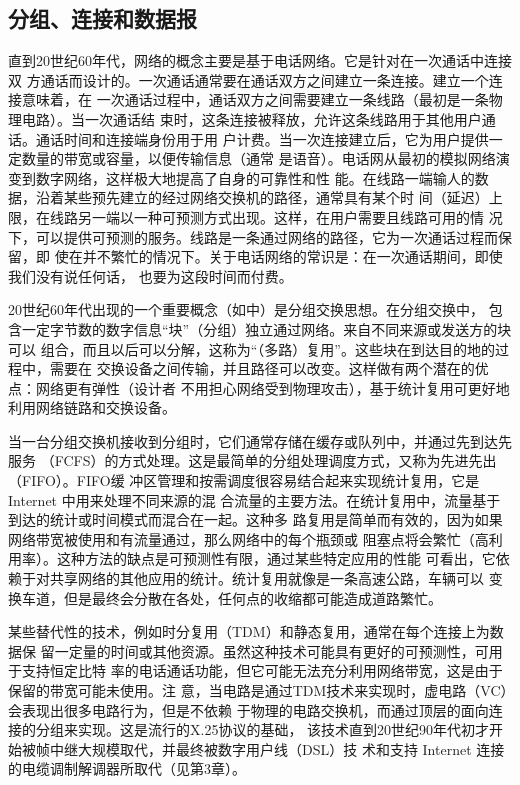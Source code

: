 \subsection{分组、连接和数据报}
直到20世纪60年代，网络的概念主要是基于电话网络。它是针对在一次通话中连接双
方通话而设计的。一次通话通常要在通话双方之间建立一条连接。建立一个连接意味着，在
一次通话过程中，通话双方之间需要建立一条线路（最初是一条物理电路）。当一次通话结
束时，这条连接被释放，允许这条线路用于其他用户通话。通话时间和连接端身份用于用
户计费。当一次连接建立后，它为用户提供一定数量的带宽或容量，以便传输信息（通常
是语音）。电话网从最初的模拟网络演变到数字网络，这样极大地提高了自身的可靠性和性
能。在线路一端输人的数据，沿着某些预先建立的经过网络交换机的路径，通常具有某个时
间（延迟）上限，在线路另一端以一种可预测方式出现。这样，在用户需要且线路可用的情
况下，可以提供可预测的服务。线路是一条通过网络的路径，它为一次通话过程而保留，即
使在并不繁忙的情况下。关于电话网络的常识是：在一次通话期间，即使我们没有说任何话，
也要为这段时间而付费。

20世纪60年代出现的一个重要概念（如\cite{baran1964distributed}中）是分组交换思想。在分组交换中，
包含一定字节数的数字信息“块”（分组）独立通过网络。来自不同来源或发送方的块可以
组合，而且以后可以分解，这称为“（多路）复用”。这些块在到达目的地的过程中，需要在
交换设备之间传输，并且路径可以改变。这样做有两个潜在的优点：网络更有弹性（设计者
不用担心网络受到物理攻击），基于统计复用可更好地利用网络链路和交换设备。

当一台分组交换机接收到分组时，它们通常存储在缓存或队列中，并通过先到达先服务
（FCFS）的方式处理。这是最简单的分组处理调度方式，又称为先进先出（FIFO）。FIFO缓
冲区管理和按需调度很容易结合起来实现统计复用，它是 Internet 中用来处理不同来源的混
合流量的主要方法。在统计复用中，流量基于到达的统计或时间模式而混合在一起。这种多
路复用是简单而有效的，因为如果网络带宽被使用和有流量通过，那么网络中的每个瓶颈或
阻塞点将会繁忙（高利用率）。这种方法的缺点是可预测性有限，通过某些特定应用的性能
可看出，它依赖于对共享网络的其他应用的统计。统计复用就像是一条高速公路，车辆可以
变换车道，但是最终会分散在各处，任何点的收缩都可能造成道路繁忙。

某些替代性的技术，例如时分复用（TDM）和静态复用，通常在每个连接上为数据保
留一定量的时间或其他资源。虽然这种技术可能具有更好的可预测性，可用于支持恒定比特
率的电话通话功能，但它可能无法充分利用网络带宽，这是由于保留的带宽可能未使用。注
意，当电路是通过TDM技术来实现时，虚电路（VC）会表现出很多电路行为，但是不依赖
于物理的电路交换机，而通过顶层的面向连接的分组来实现。这是流行的X.25协议的基础，
该技术直到20世纪90年代初才开始被帧中继大规模取代，并最终被数字用户线（DSL）技
术和支持 Internet 连接的电缆调制解调器所取代（见第3章）。

